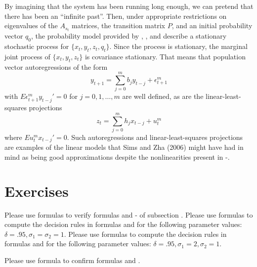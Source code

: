  By   imagining that the system has been running 
  long enough, we can pretend that there has been  an ``infinite past''. 
 Then, under appropriate restrictions on  eigenvalues of the $A_{s_t}$ matrices, the transition matrix $P$, and an  initial probability vector $q_0$, the probability model
provided by , , and   describe a  stationary stochastic process 
for   $\{x_t, y_t, z_t, q_t \}$.  Since the process is stationary, the marginal joint process of  $\{x_t, y_t, z_t\}$  is  covariance
stationary.  That means that population vector autoregressions  of the form
$$ y_{t+1} = \sum_{j=0}^m b_j y_{t-j} + \epsilon_{t+1}^m $$
with $E \epsilon_{t+1}^m y_{t-j}' =0 $ for $j =0, 1, \ldots, m$ are well defined, as are  the linear-least-squares 
projections 
$$ z_t = \sum_{j=0}^m h_j x_{t-j} + u_t^m $$
where $E u_t^m x_{t-j}' = 0$.  
Such autoregressions and  linear-least-squares projections are examples of 
the linear models that Sims and Zha (2006) might have had  in mind as  being   good approximations despite 
the nonlinearities present in -. 


%
%




\showchaptIDfalse
\showsectIDfalse
\section{Exercises}
\showchaptIDtrue
\showsectIDtrue
{}

\medskip
{}  %
\medskip
{}  Please use formulas  to verify formulas  
and - of subsection .
\medskip
{} Please use formulas  to compute the decision rules
in formulas    and  for the following parameter values:
$\delta = .95, \sigma_1= \sigma_2 =1$.
\medskip
{}
 Please use formulas  to compute the decision rules
in formulas    and  for the following parameter values:
$\delta = .95, \sigma_1= 2,  \sigma_2 =1$.

\medskip
{} Please use formula  to confirm formulas
 and .\medskip


